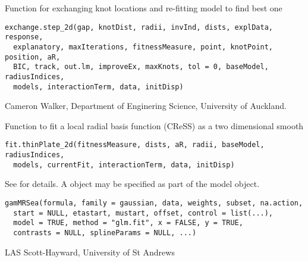 \documentclass[a4paper]{book}
\begin{document}
%
\begin{Description}\relax
Function for exchanging knot locations and re-fitting model to find best one
\end{Description}
%
\begin{Usage}
\begin{verbatim}
exchange.step_2d(gap, knotDist, radii, invInd, dists, explData, response,
  explanatory, maxIterations, fitnessMeasure, point, knotPoint, position, aR,
  BIC, track, out.lm, improveEx, maxKnots, tol = 0, baseModel, radiusIndices,
  models, interactionTerm, data, initDisp)
\end{verbatim}
\end{Usage}
%
\begin{Author}\relax
Cameron Walker, Department of Enginering Science, University of Auckland.
\end{Author}
%
\begin{Description}\relax
Function to fit a local radial basis function (CReSS) as a two dimensional smooth
\end{Description}
%
\begin{Usage}
\begin{verbatim}
fit.thinPlate_2d(fitnessMeasure, dists, aR, radii, baseModel, radiusIndices,
  models, currentFit, interactionTerm, data, initDisp)
\end{verbatim}
\end{Usage}
%
\begin{Description}\relax
See  for details.  A  object may be specified as part of the model object.
\end{Description}
%
\begin{Usage}
\begin{verbatim}
gamMRSea(formula, family = gaussian, data, weights, subset, na.action,
  start = NULL, etastart, mustart, offset, control = list(...),
  model = TRUE, method = "glm.fit", x = FALSE, y = TRUE,
  contrasts = NULL, splineParams = NULL, ...)
\end{verbatim}
\end{Usage}
%
\begin{Author}\relax
LAS Scott-Hayward, University of St Andrews
\end{Author}
\end{document}
